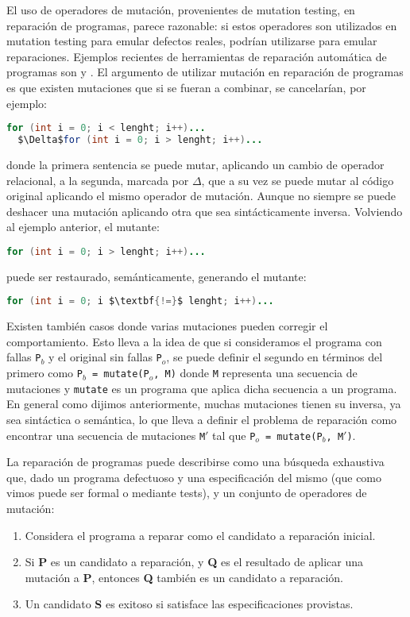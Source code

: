 El uso de operadores de mutaci\'on, provenientes de mutation testing, en reparaci\'on de programas, parece razonable: si estos operadores son utilizados en mutation testing para emular defectos reales, podr\'ian utilizarse para emular reparaciones. Ejemplos recientes de herramientas de reparaci\'on autom\'atica de programas son \cite{bibliography.repair.mutation.DebroyW10} y  \cite{bibliography.repair.mutation.AlloyWang18}. El argumento de utilizar mutaci\'on en reparaci\'on de programas es que existen mutaciones que si se fueran a combinar, se cancelar\'ian, por ejemplo:
\begin{lstlisting}[mathescape=true, language=Java,basicstyle={}]
  for (int i = 0; i < lenght; i++)...
  $\Delta$for (int i = 0; i > lenght; i++)...
\end{lstlisting}
donde la primera sentencia se puede mutar, aplicando un cambio de operador relacional, a la segunda, marcada por $\Delta$, que a su vez se puede mutar al c\'odigo original aplicando el mismo operador de mutaci\'on. Aunque no siempre se puede deshacer una mutaci\'on aplicando otra que sea sint\'acticamente inversa. 
Volviendo al ejemplo anterior, el mutante:
\begin{lstlisting}[mathescape=true, language=Java,basicstyle={}]
  for (int i = 0; i > lenght; i++)...
\end{lstlisting}
puede ser restaurado, sem\'anticamente, generando el mutante:
\begin{lstlisting}[mathescape=true, language=Java,basicstyle={}]
  for (int i = 0; i $\textbf{!=}$ lenght; i++)...
\end{lstlisting}
Existen tambi\'en casos donde varias mutaciones pueden corregir el comportamiento. Esto lleva a la idea de que si consideramos el programa con fallas \texttt{P$_b$} y el original sin fallas \texttt{P$_o$}, se puede definir el segundo en t\'erminos del primero como \texttt{P$_b$ = mutate(P$_o$, M)} donde \texttt{M} representa una secuencia de mutaciones y \texttt{mutate} es un programa que aplica dicha secuencia a un programa. En general como dijimos anteriormente, muchas mutaciones tienen su inversa, ya sea sint\'actica o sem\'antica, lo que lleva a definir el problema de reparaci\'on como encontrar una secuencia de mutaciones \texttt{M$\prime$} tal que \texttt{P$_o$ = mutate(P$_b$, M$\prime$)}.

La reparaci\'on de programas puede describirse como una b\'usqueda exhaustiva que, dado un programa defectuoso y una especificaci\'on del mismo (que como vimos puede ser formal o mediante tests), y un conjunto de operadores de mutaci\'on:
\begin{enumerate}
	\item Considera el programa a reparar como el candidato a reparaci\'on inicial.
	
	\item Si \textbf{P} es un candidato a reparaci\'on, y \textbf{Q} es el resultado de aplicar una mutaci\'on a \textbf{P}, entonces \textbf{Q} tambi\'en es un candidato a reparaci\'on.
	
	\item  Un candidato \textbf{S} es exitoso si satisface las especificaciones provistas.
\end{enumerate}

